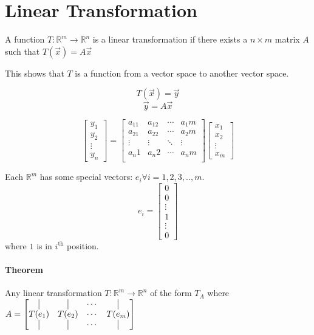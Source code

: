 \documentclass{article}
\begin{document}
\section{Linear Transformation}
A function $T: \mathbb{R}^m \rightarrow \mathbb{R}^n$ is a linear transformation if there exists a $n\times m $ matrix $A$ such that $T(\vec{x}) = A\vec{x}$

This shows that $T$ is a function from a vector space to another vector space.

\[ T(\vec{x}) = \vec{y} \]
\[ \vec{y} = A\vec{x} \]

\[ \begin{bmatrix}
    y_1 \\
    y_2 \\
    \vdots \\
    y_n
\end{bmatrix} = \begin{bmatrix}
    a_11 & a_12 & \cdots & a_1m \\
    a_21 & a_22 & \cdots & a_2m \\
    \vdots & \vdots & \ddots & \vdots \\
    a_n1 & a_n2 & \cdots & a_nm \\
\end{bmatrix} \begin{bmatrix}
    x_1 \\
    x_2 \\
    \vdots \\
    x_m
\end{bmatrix} \]

Each $\mathbb{R}^m$ has some special vectors: \( e_i \forall i = 1,2,3,..,m \).\\
\[ e_i = \begin{bmatrix}
    0 \\
    0 \\
    \vdots \\
    1 \\ 
    \vdots \\
    0
\end{bmatrix} \]
where $1$ is in $i^{\text{th}}$ position.

\paragraph{Theorem} Any linear transformation $T: \mathbb{R}^m \rightarrow \mathbb{R}^n$ of the form $T_A$ where $A = \begin{bmatrix}
    \vline & \vline & \cdots & \vline \\
    T(e_1) & T(e_2) & \cdots & T(e_m) \\
    \vline & \vline & \cdots & \vline \\
\end{bmatrix}$
\end{document}
